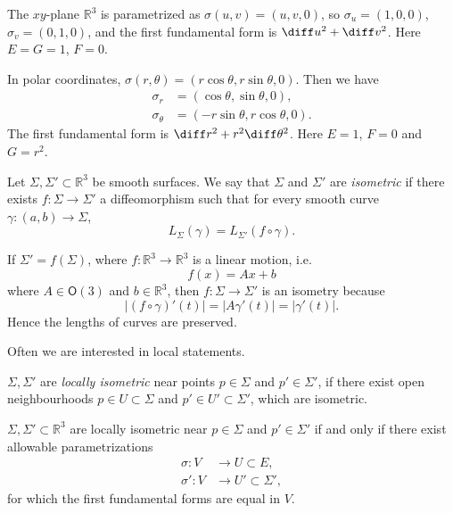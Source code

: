 \documentclass[12pt]{article}
\begin{document}
\begin{exbox}
	The $xy$-plane $\mathbb{R}^3$ is parametrized as $\sigma(u, v) = (u, v, 0)$, so $\sigma_u = (1, 0, 0)$, $\sigma_v = (0, 1, 0)$, and the first fundamental form is $\diff u^2 + \diff v^2$. Here $E = G = 1$, $F = 0$.

	In polar coordinates, $\sigma(r, \theta) = (r \cos \theta, r \sin \theta, 0)$. Then we have
	\begin{align*}
		\sigma_r &= (\cos \theta, \sin \theta, 0),\\
		\sigma_{\theta} &= (- r \sin \theta, r \cos \theta, 0).
	\end{align*}
	The first fundamental form is $\diff r^2 + r^2 \diff \theta^2$. Here $E = 1$, $F = 0$ and $G = r^2$.
\end{exbox}

\begin{definition}
	Let $\Sigma, \Sigma' \subset \mathbb{R}^3$ be smooth surfaces. We say that $\Sigma$ and $\Sigma'$ are \emph{isometric} if there exists $f : \Sigma \to \Sigma'$ a diffeomorphism such that for every smooth curve $\gamma : (a, b) \to \Sigma$,
	\[
	L_{\Sigma}(\gamma) = L_{\Sigma'}(f \circ \gamma)
	.\]
\end{definition}

\begin{exbox}
	If $\Sigma' = f(\Sigma)$, where $f : \mathbb{R}^3 \to \mathbb{R}^3$ is a linear motion, i.e.
	\[
	f(x) = Ax + b
	\]
	where $A \in \mathsf{O}(3)$ and $b \in \mathbb{R}^3$, then $f : \Sigma \to \Sigma'$ is an isometry because
	\[
	|(f \circ \gamma)'(t)| = |A \gamma'(t)| = |\gamma'(t)|
	.\]
	Hence the lengths of curves are preserved.
\end{exbox}

Often we are interested in local statements.

\begin{definition}
	$\Sigma, \Sigma'$ are \emph{locally isometric} near points $p \in \Sigma$ and $p' \in \Sigma'$, if there exist open neighbourhoods $p \in U \subset \Sigma$ and $p' \in U' \subset \Sigma'$, which are isometric.
\end{definition}

\begin{lemma}
	$\Sigma, \Sigma' \subset \mathbb{R}^3$ are locally isometric near $p \in \Sigma$ and $p' \in \Sigma'$ if and only if there exist allowable parametrizations
	\begin{align*}
		\sigma : V &\to U \subset E, \\
		\sigma' : V &\to U' \subset \Sigma',
	\end{align*}
	for which the first fundamental forms are equal in $V$.
\end{lemma}
\end{document}
